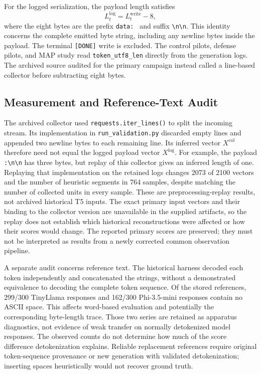 \documentclass[electronics,article,submit,pdftex,moreauthors]{Definitions/mdpi}
\begin{document}
For the logged serialization, the payload length satisfies
\begin{equation}
L^{\mathrm{log}}_t = L^{\mathrm{write}}_t - 8,
\end{equation}
where the eight bytes are the prefix \texttt{data: } and suffix \texttt{\textbackslash n\textbackslash n}. This identity concerns the complete emitted byte string, including any newline bytes inside the payload. The terminal \texttt{[DONE]} write is excluded. The control pilots, defense pilots, and MAP study read \texttt{token\_utf8\_len} directly from the generation logs. The archived source audited for the primary campaign instead called a line-based collector before subtracting eight bytes.

\subsection{Measurement and Reference-Text Audit}\label{sec:measurement-audit}
The archived collector used \texttt{requests.iter\_lines()} to split the incoming stream. Its implementation in \texttt{run\_validation.py} discarded empty lines and appended two newline bytes to each remaining line. Its inferred vector $X^{\mathrm{col}}$ therefore need not equal the logged payload vector $X^{\mathrm{log}}$. For example, the payload \texttt{:\textbackslash n\textbackslash n} has three bytes, but replay of this collector gives an inferred length of one. Replaying that implementation on the retained logs changes 2073 of 2100 vectors and the number of heuristic segments in 764 samples, despite matching the number of collected units in every sample. These are preprocessing-replay results, not archived historical T5 inputs. The exact primary input vectors and their binding to the collector version are unavailable in the supplied artifacts, so the replay does not establish which historical reconstructions were affected or how their scores would change. The reported primary scores are preserved; they must not be interpreted as results from a newly corrected common observation pipeline.

A separate audit concerns reference text. The historical harness decoded each token independently and concatenated the strings, without a demonstrated equivalence to decoding the complete token sequence. Of the stored references, 299/300 TinyLlama responses and 162/300 Phi-3.5-mini responses contain no ASCII space. This affects word-based evaluation and potentially the corresponding byte-length trace. Those two series are retained as apparatus diagnostics, not evidence of weak transfer on normally detokenized model responses. The observed counts do not determine how much of the score difference detokenization explains. Reliable replacement references require original token-sequence provenance or new generation with validated detokenization; inserting spaces heuristically would not recover ground truth.
\end{document}
